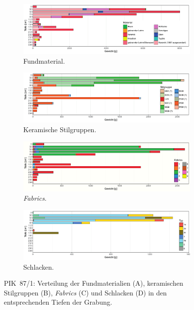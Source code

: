 \begin{figure}[p]
	\centering
	\begin{subfigure}{\textwidth}	
		\centering
		\includegraphics[width = \textwidth]{fig/9-8_PIK87-1_VerteilungFunde_R.pdf}
		\caption{Fundmaterial.\vspace{1em}}	
		\label{fig:PIK87-1_VerteilungFunde}
	\end{subfigure}
	\begin{subfigure}{\textwidth}
		\centering
		\includegraphics[width = \textwidth]{fig/9-8_PIK87-1_KeramikStilgruppen_R.pdf}
		\caption{Keramische Stilgruppen.\vspace{1em}}
		\label{fig:PIK87-1_VerteilungStilgr}
	\end{subfigure}
	\begin{subfigure}{\textwidth}	
		\centering
		\includegraphics[width = \textwidth]{fig/9-8_PIK87-1_Fabrics_R.pdf}
		\caption{\textit{Fabrics}.\vspace{1em}}
		\label{fig:PIK87-1_VerteilungFabrics}
	\end{subfigure}
	\begin{subfigure}{\textwidth}	
		\centering
		\includegraphics[width = \textwidth]{fig/9-8_PIK87-1_Schlacken_R.pdf}
		\caption{Schlacken.}
		\label{fig:PIK87-1_Schlacken}
	\end{subfigure}
	\caption{PIK~87/1: Verteilung der Fundmaterialien (A), keramischen Stilgruppen (B), \textit{Fabrics} (C) und Schlacken (D) in den entsprechenden Tiefen der Grabung.}
	\label{fig:PIK87-1_KeramikVerteilung}
\end{figure}

